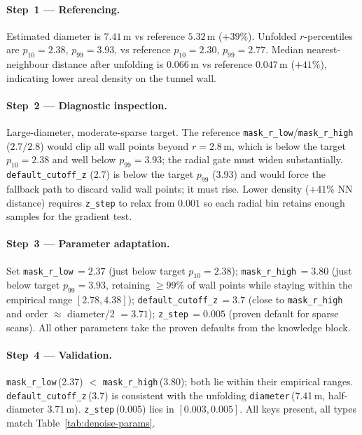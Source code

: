 \paragraph{Step~1 --- Referencing.}
Estimated diameter is $7.41$\,m vs reference $5.32$\,m ($+39\%$). Unfolded $r$-percentiles are $p_{10}=2.38$, $p_{99}=3.93$, vs reference $p_{10}=2.30$, $p_{99}=2.77$. Median nearest-neighbour distance after unfolding is $0.066$\,m vs reference $0.047$\,m ($+41\%$), indicating lower areal density on the tunnel wall.

\paragraph{Step~2 --- Diagnostic inspection.}
Large-diameter, moderate-sparse target. The reference \texttt{mask\_r\_low}/\texttt{mask\_r\_high} ($2.7/2.8$) would clip all wall points beyond $r=2.8$\,m, which is below the target $p_{10}=2.38$ and well below $p_{99}=3.93$; the radial gate must widen substantially. \texttt{default\_cutoff\_z} (2.7) is below the target $p_{99}$ (3.93) and would force the fallback path to discard valid wall points; it must rise. Lower density ($+41\%$ NN distance) requires \texttt{z\_step} to relax from $0.001$ so each radial bin retains enough samples for the gradient test.

\paragraph{Step~3 --- Parameter adaptation.}
Set \texttt{mask\_r\_low}\,$=2.37$ (just below target $p_{10}=2.38$); \texttt{mask\_r\_high}\,$=3.80$ (just below target $p_{99}=3.93$, retaining $\geq 99\%$ of wall points while staying within the empirical range $[2.78, 4.38]$); \texttt{default\_cutoff\_z}\,$=3.7$ (close to \texttt{mask\_r\_high} and order $\approx$ diameter/2 $= 3.71$); \texttt{z\_step}\,$=0.005$ (proven default for sparse scans). All other parameters take the proven defaults from the knowledge block.

\paragraph{Step~4 --- Validation.}
\texttt{mask\_r\_low}\,(2.37) $<$ \texttt{mask\_r\_high}\,(3.80); both lie within their empirical ranges. \texttt{default\_cutoff\_z}\,(3.7) is consistent with the unfolding \texttt{diameter}\,(7.41\,m, half-diameter $3.71$\,m). \texttt{z\_step}\,(0.005) lies in $[0.003, 0.005]$. All keys present, all types match Table~\ref{tab:denoise-params}.

